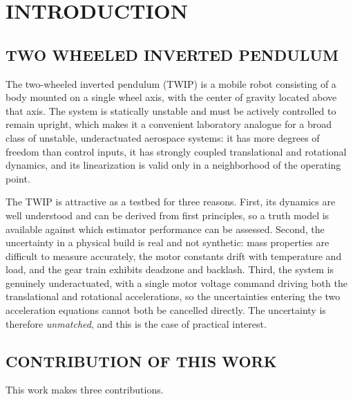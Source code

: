 \chapter{INTRODUCTION}
\label{ch:intro}

\section{TWO WHEELED INVERTED PENDULUM}

The two-wheeled inverted pendulum (TWIP) is a mobile robot consisting of a body
mounted on a single wheel axis, with the center of gravity located above that
axis. The system is statically unstable and must be actively controlled to
remain upright, which makes it a convenient laboratory analogue for a broad
class of unstable, underactuated aerospace systems: it has more degrees of
freedom than control inputs, it has strongly coupled translational and
rotational dynamics, and its linearization is valid only in a neighborhood of
the operating point.

The TWIP is attractive as a testbed for three reasons. First, its dynamics are
well understood and can be derived from first principles, so a truth model is
available against which estimator performance can be assessed. Second, the
uncertainty in a physical build is real and not synthetic: mass properties are
difficult to measure accurately, the motor constants drift with temperature and
load, and the gear train exhibits deadzone and backlash. Third, the system is
genuinely underactuated, with a single motor voltage command driving both the
translational and rotational accelerations, so the uncertainties entering the
two acceleration equations cannot both be cancelled directly. The uncertainty is
therefore \emph{unmatched}, and this is the case of practical interest.

\section{CONTRIBUTION OF THIS WORK}

This work makes three contributions.

